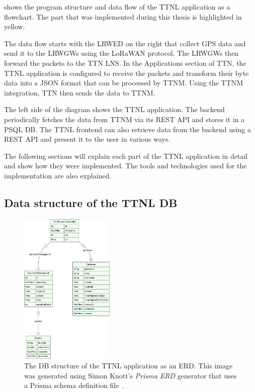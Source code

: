  shows the program structure and data flow of the \ac{TTNL} application as a flowchart.
The part that was implemented during this thesis is highlighted in yellow.

The data flow starts with the \acl{LRWED} on the right that collect \ac{GPS} data and send it to the \aclp{LRWGW} using the \ac{LoRaWAN} protocol.
The \aclp{LRWGW} then forward the packets to the \ac{TTN} \ac{LNS}.
In the Applications section of \ac{TTN}, the \ac{TTNL} application is configured to receive the packets and transform their byte data into a \ac{JSON} format that can be processed by \ac{TTNM}.
Using the \ac{TTNM} integration, \ac{TTN} then sends the data to \ac{TTNM}.

The left side of the diagram shows the \ac{TTNL} application.
The backend periodically fetches the data from \ac{TTNM} via its \ac{REST} \ac{API} and stores it in a \ac{PSQL} \ac{DB}.
The \ac{TTNL} frontend can also retrieve data from the backend using a \ac{REST} \ac{API} and present it to the user in various ways.

The following sections will explain each part of the \ac{TTNL} application in detail and show how they were implemented.
The tools and technologies used for the implementation are also explained.

\subsection{Data structure of the \acl{TTNL} \acl{DB}}

\begin{figure}[htbp]
    \centering
    \includegraphics[width=0.4\textwidth]{pictures/ttn-locator/backend/prisma-erd.eps}
    \caption{
        The \ac{DB} structure of the \ac{TTNL} application as an \ac{ERD}.
        This image was generated using Simon Knott's \emph{Prisma ERD} generator that uses a Prisma schema definition file~\cite{simon_knott_prisma_2023}.
    }\label{pic:prisma-erd}
\end{figure}

